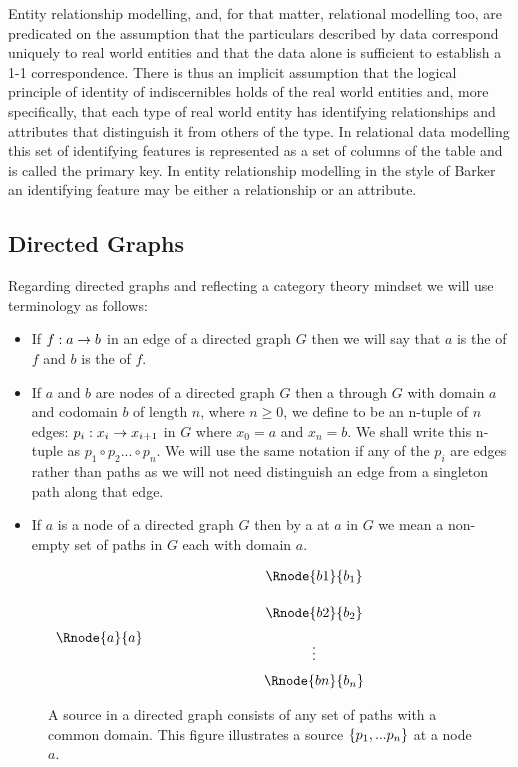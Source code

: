 Entity relationship modelling, and, for that matter, relational modelling too, are predicated on the assumption that the particulars described by data correspond uniquely to real world entities and that the data alone is sufficient to establish a 1-1 correspondence. There is thus an implicit assumption that the logical principle of identity of indiscernibles holds of the real world entities and, more specifically, that each type of real world entity has identifying relationships and attributes that distinguish it from  others of the type. In relational data modelling this set of identifying features is represented as a set of columns of the table and is called the primary key. In entity relationship modelling in the style of Barker an identifying feature may be either a relationship or an attribute.   

\subsection{Directed Graphs}
Regarding directed graphs and reflecting a category theory mindset we will use terminology as follows:
\begin{itemize}
\item
 If $f: a \rightarrow b$ in an edge of a directed graph $G$ then we will say that $a$ is the  of $f$ and $b$ is the  of $f$.
\item
If $a$ and $b$ are nodes of a directed graph $G$ then a  through $G$ with domain $a$ and 
codomain $b$ of length $n$, where $n \geq 0$, we define to be  an n-tuple of  $n$ edges: $p_i: x_i \rightarrow x_{i+1} $ in $G$ where $x_0=a$ and $x_n=b$. We shall write this n-tuple as $p_1 \circ p_2... \circ p_n$. 
We will use the same notation if any of the $p_i$ are edges rather than paths as we will not need distinguish  an edge from a singleton path along that edge. 
\item
If $a$ is a node of a directed graph $G$ then by a  at $a$ in $G$ we mean a non-empty set of paths in $G$ each with domain $a$.
\end{itemize}
\begin{figure}
\setlength{\arraycolsep}{.2cm}
\begin{center}
$
\begin{array}{cp{2cm}ccp{2cm}c}
             & &         & \Rnode{b1}{b_1} \\ [0.5cm]
						 & &         & \Rnode{b2}{b_2} \\ [0.2cm]
\Rnode{a}{a} & &         &                 \\ [-0.2cm]						
             & &         &    \vdots       \\ [0.2cm]
             & &         & \Rnode{bn}{b_n} \\ 
\end{array}
$
\end{center}
\caption{A source in a directed graph consists of any set of paths with a common domain. This figure illustrates a source $\left\{p_1,...p_n\right\}$ at a node $a$.}
\label{sourceillustration}
\end{figure}

